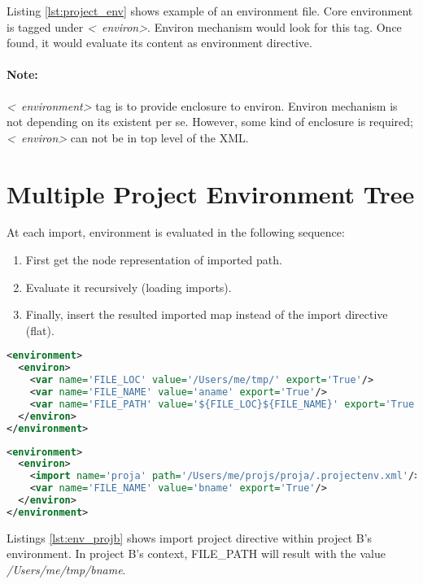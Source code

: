 \documentclass[design.tex]{subfiles}
\begin{document}
Listing \ref{lst:project_env} shows example of an environment file.  Core environment is tagged under \emph{\textless~environ\textgreater}.  Environ mechanism would look for this tag.  Once found, it would evaluate its content as environment directive.

\paragraph{Note:} \emph{\textless~environment\textgreater} tag is to provide enclosure to environ.  Environ mechanism is not depending on its existent per se.  However, some kind of enclosure is required;  \emph{\textless~environ\textgreater} can not be in top level of the XML.

\section{Multiple Project Environment Tree}
At each import, environment is evaluated in the following sequence:
\begin{enumerate}
	\item First get the node representation of imported path.
	\item Evaluate it recursively (loading imports).
	\item Finally, insert the resulted imported map instead of the import directive (flat).
\end{enumerate} 

%

\begin{lstlisting}[language=XML, label=lst:env_proja, caption='Project A: /Users/me/projs/proja/.projectenv.xml]
<environment>
  <environ>
    <var name='FILE_LOC' value='/Users/me/tmp/' export='True'/>
    <var name='FILE_NAME' value='aname' export='True'/>
    <var name='FILE_PATH' value='${FILE_LOC}${FILE_NAME}' export='True'/>
  </environ>
</environment>
\end{lstlisting}

\begin{lstlisting}[language=XML, label=lst:env_projb, caption='Project B: /Users/me/projs/projb/.envoverride.xml']
<environment>
  <environ>
    <import name='proja' path='/Users/me/projs/proja/.projectenv.xml'/>
    <var name='FILE_NAME' value='bname' export='True'/>
  </environ>
</environment>
\end{lstlisting}

Listings \ref{lst:env_projb} shows import project directive within project B's environment.  In project B's context, FILE\_PATH will result with the value \emph{/Users/me/tmp/bname}.
\end{document}
